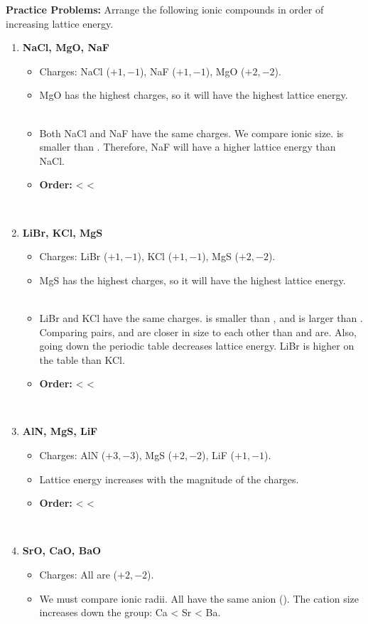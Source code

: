 \documentclass{article}
\begin{document}
\textbf{Practice Problems:} Arrange the following ionic compounds in order of increasing lattice energy.
\begin{enumerate}[itemsep=5pt]
    \item \textbf{NaCl, MgO, NaF}
    \begin{itemize}
        \item Charges: NaCl ($+1, -1$), NaF ($+1, -1$), MgO ($+2, -2$).
        \item MgO has the highest charges, so it will have the highest lattice energy.
        \item Both NaCl and NaF have the same charges. We compare ionic size.  is smaller than . Therefore, NaF will have a higher lattice energy than NaCl.
        \item \textbf{Order:}  <  < 
    \end{itemize}
    \item \textbf{LiBr, KCl, MgS}
    \begin{itemize}
        \item Charges: LiBr ($+1, -1$), KCl ($+1, -1$), MgS ($+2, -2$).
        \item MgS has the highest charges, so it will have the highest lattice energy.
        \item LiBr and KCl have the same charges.  is smaller than , and  is larger than . Comparing pairs,  and  are closer in size to each other than  and  are. Also, going down the periodic table decreases lattice energy. LiBr is higher on the table than KCl.
        \item \textbf{Order:}  <  < 
    \end{itemize}
    \item \textbf{AlN, MgS, LiF}
    \begin{itemize}
        \item Charges: AlN ($+3, -3$), MgS ($+2, -2$), LiF ($+1, -1$).
        \item Lattice energy increases with the magnitude of the charges.
        \item \textbf{Order:}  <  < 
    \end{itemize}
    \item \textbf{SrO, CaO, BaO}
    \begin{itemize}
        \item Charges: All are ($+2, -2$).
        \item We must compare ionic radii. All have the same anion (). The cation size increases down the group: Ca < Sr < Ba.

\end{itemize}
\end{enumerate}
\end{document}
